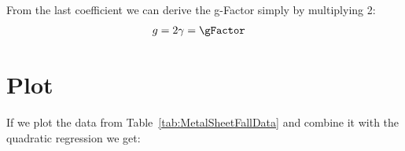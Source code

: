 \documentclass[11pt]{article}
\begin{document}
    From the last coefficient we can derive the g-Factor simply by multiplying 2:
    \begin{align*}
        g &= 2 \gamma = \gFactor
    \end{align*}
    
    \section{Plot}
    If we plot the data from Table~\ref{tab:MetalSheetFallData} and combine it with the quadratic regression we get:
    
    
\end{document}
